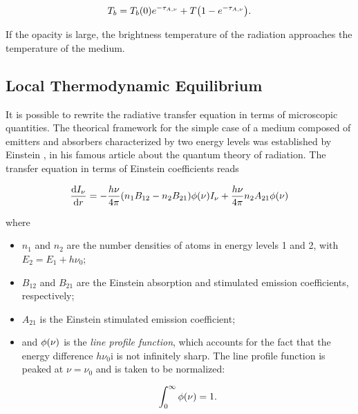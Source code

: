 \begin{equation}
        T_b = T_b\qty(0) e^{-\tau_{A,\nu}} + T\qty(1 -
        e^{-\tau_{A,\nu}}).
        \label{eq:rte_solution_thermal}
\end{equation}

If the opacity is large, the brightness temperature of the radiation
approaches the temperature of the medium.

\subsection{Local Thermodynamic Equilibrium}

It is possible to rewrite the radiative transfer equation in terms of
microscopic quantities. The theorical framework for the simple case of a
medium composed of emitters and absorbers characterized by two energy
levels was established by Einstein \autocite{einstein1917the},
in his famous article about the quantum theory of radiation.
The transfer equation in terms of Einstein coefficients reads

\begin{equation}
        \dv{I_\nu}{r} = -\frac{h\nu}{4\pi}\qty(n_1 B_{12} -
        n_2 B_{21})\phi\qty(\nu)I_\nu +
        \frac{h\nu}{4\pi} n_2 A_{21}\phi\qty(\nu)
\end{equation}

where

\begin{itemize}
        \item $n_1$ and $n_2$ are the number densities of atoms in energy
        levels 1 and 2, with $E_2 = E_1 + h\nu_0$;
        \item $B_{12}$ and $B_{21}$ are the Einstein absorption and
        stimulated emission coefficients, respectively;
        \item $A_{21}$ is the Einstein stimulated emission coefficient;
        \item and $\phi\qty(\nu)$ is the \emph{line profile function},
        which accounts for the fact that the energy difference $h\nu_0$i
        is not infinitely sharp. The line profile function is peaked at
        $\nu = \nu_0$ and is taken to be normalized:

        \begin{equation}
                \int^\infty_0 \phi\qty(\nu) = 1.
        \end{equation}

\end{itemize}

